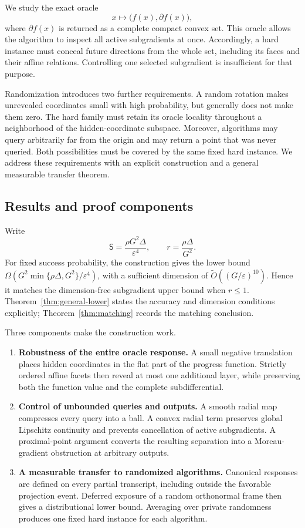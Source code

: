 \documentclass[11pt,a4paper]{article}
\newcommand{\eps}{\varepsilon}
\theoremstyle{definition}
\numberwithin{equation}{section}
\newcommand{\rate}{\mathsf S}
\begin{document}
We study the exact oracle
\[
 x\longmapsto \bigl(f(x),\partial f(x)\bigr),
\]
where $\partial f(x)$ is returned as a complete compact convex set.
This oracle allows the algorithm to inspect all active subgradients at once.
Accordingly, a hard instance must conceal future directions from the whole
set, including its faces and their affine relations. Controlling one
selected subgradient is insufficient for that purpose.

Randomization introduces two further requirements. A random rotation makes
unrevealed coordinates small with high probability, but generally does not
make them zero. The hard family must retain its oracle locality throughout
a neighborhood of the hidden-coordinate subspace. Moreover, algorithms may
query arbitrarily far from the origin and may return a point that was never
queried. Both possibilities must be covered by the same fixed hard instance.
We address these requirements with an explicit construction and a general
measurable transfer theorem.

\subsection{Results and proof components}

Write
\begin{equation}\label{eq:intro-rate}
 \rate=\frac{\rho G^2\Delta}{\eps^4},
 \qquad r=\frac{\rho\Delta}{G^2}.
\end{equation}
For fixed success probability, the construction gives the lower bound
$\Omega(G^2\min\{\rho\Delta,G^2\}/\eps^4)$, with a sufficient dimension of
$\widetilde O((G/\eps)^{10})$. Hence it matches the dimension-free subgradient
upper bound when $r\le1$. Theorem~\ref{thm:general-lower} states the accuracy
and dimension conditions explicitly; Theorem~\ref{thm:matching} records the
matching conclusion.

Three components make the construction work.
\begin{enumerate}[label=(\roman*)]
\item \textbf{Robustness of the entire oracle response.}
A small negative translation places hidden coordinates in the flat part of
the progress function. Strictly ordered affine facets then reveal at most
one additional layer, while preserving both the function value and the
complete subdifferential.
\item \textbf{Control of unbounded queries and outputs.}
A smooth radial map compresses every query into a ball. A convex radial
term preserves global Lipschitz continuity and prevents cancellation of
active subgradients. A proximal-point argument converts the resulting
separation into a Moreau-gradient obstruction at arbitrary outputs.
\item \textbf{A measurable transfer to randomized algorithms.}
Canonical responses are defined on every partial transcript, including
outside the favorable projection event. Deferred exposure of a random
orthonormal frame then gives a distributional lower bound. Averaging over
private randomness produces one fixed hard instance for each algorithm.
\end{enumerate}
\end{document}
